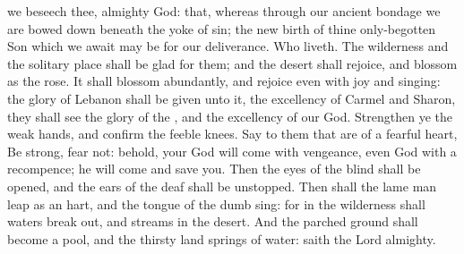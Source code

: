 \collect
{} we beseech thee, almighty God: that, whereas through our ancient bondage we are bowed down beneath the yoke of sin; the new birth of thine only-begotten Son which we await may be for our deliverance. Who liveth.
 The wilderness and the solitary place shall be glad for them; and the desert shall rejoice, and blossom as the rose. It shall blossom abundantly, and rejoice even with joy and singing: the glory of Lebanon shall be given unto it, the excellency of Carmel and Sharon, they shall see the glory of the , and the excellency of our God. Strengthen ye the weak hands, and confirm the feeble knees. Say to them that are of a fearful heart, Be strong, fear not: behold, your God will come with vengeance, even God with a recompence; he will come and save you. Then the eyes of the blind shall be opened, and the ears of the deaf shall be unstopped. Then shall the lame man leap as an hart, and the tongue of the dumb sing: for in the wilderness shall waters break out, and streams in the desert. And the parched ground shall become a pool, and the thirsty land springs of water: %
saith the Lord almighty.


